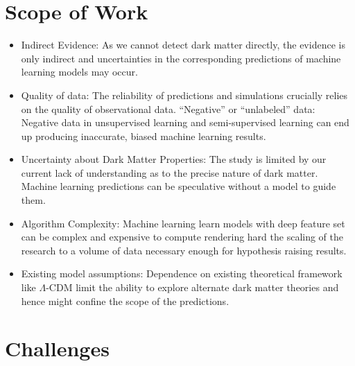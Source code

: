 \section{Scope of Work}
\begin{itemize}

    \item Indirect Evidence: As we cannot detect dark matter directly, the evidence is only indirect and uncertainties in the corresponding predictions of machine learning models may occur.

    \item Quality of data: The reliability of predictions and simulations crucially relies on the quality of observational data. “Negative” or “unlabeled” data: Negative data in unsupervised learning and semi-supervised learning can end up producing inaccurate, biased machine learning results.

    \item Uncertainty about Dark Matter Properties: The study is limited by our current lack of understanding as to the precise nature of dark matter. Machine learning predictions can be speculative without a model to guide them.

    \item Algorithm Complexity: Machine learning learn models with deep feature set can be complex and expensive to compute rendering hard the scaling of the research to a volume of data necessary enough for hypothesis raising results.

    \item Existing model assumptions: Dependence on existing theoretical framework like $\Lambda$-CDM limit the ability to explore alternate dark matter theories and hence might confine the scope of the predictions.

\end{itemize}
\section{Challenges}


